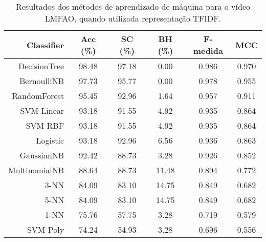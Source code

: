 \begin{table}[!htb]
\centering
\caption{Resultados dos métodos de aprendizado de máquina para o vídeo LMFAO, quando utilizada representação TFIDF.}
\label{tab:LMFAO-tfidf}
\begin{tabular}{r|c|c|c|c|c}
\hline\hline
Classifier & Acc (\%) & SC (\%) & BH (\%) & F-medida & MCC \\ \hline
DecisionTree & 98.48 & 97.18 & 0.00 & 0.986 & 0.970 & \\
BernoulliNB & 97.73 & 95.77 & 0.00 & 0.978 & 0.955 & \\
RandomForest & 95.45 & 92.96 & 1.64 & 0.957 & 0.911 & \\
SVM Linear & 93.18 & 91.55 & 4.92 & 0.935 & 0.864 & \\
SVM RBF & 93.18 & 91.55 & 4.92 & 0.935 & 0.864 & \\
Logistic & 93.18 & 92.96 & 6.56 & 0.936 & 0.863 & \\
GaussianNB & 92.42 & 88.73 & 3.28 & 0.926 & 0.852 & \\
MultinomialNB & 88.64 & 88.73 & 11.48 & 0.894 & 0.772 & \\
3-NN & 84.09 & 83.10 & 14.75 & 0.849 & 0.682 & \\
5-NN & 84.09 & 83.10 & 14.75 & 0.849 & 0.682 & \\
1-NN & 75.76 & 57.75 & 3.28 & 0.719 & 0.579 & \\
SVM Poly & 74.24 & 54.93 & 3.28 & 0.696 & 0.556 & \\
\hline\hline
\end{tabular}
\end{table}
